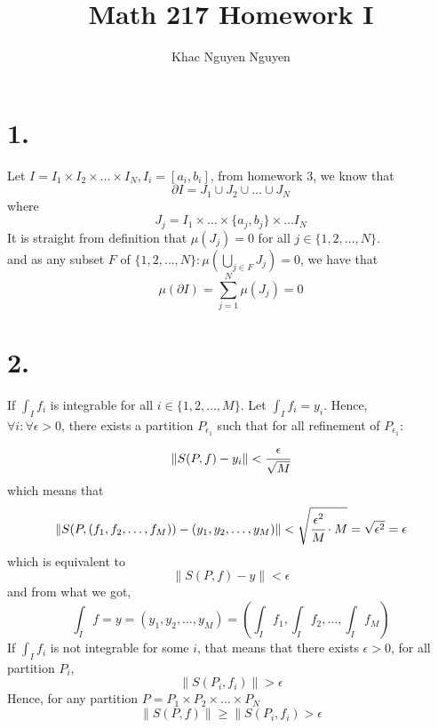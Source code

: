 \documentclass[11pt]{article}
\title{\textbf{Math 217 Homework I}}
\author{Khac Nguyen Nguyen}
\date{}
\begin{document}
\section*{1.}
Let $I = I_1 \times I_2 \times \ldots \times I_N, I_i = [a_i,b_i]$, from homework 3, we know that 
\[
    \partial I = J_1 \cup J_2 \cup \ldots \cup J_N  
\]
where 
\[
    J_j = I_1 \times \ldots \times \{a_j,b_j\} \times \ldots I_N
\]
It is straight from definition that $\mu(J_j) = 0$ for all $j \in \{1,2,\ldots ,N\}.$ \\
and as any subset $F$ of $\{1,2,\ldots,N\}: \mu(\bigcup_{j\in F} J_j) = 0$, we have that 
\[
    \mu(\partial I) = \sum_{j=1}^N \mu(J_j) = 0
\]
\pagebreak
\section*{2.}
If $\int_I f_i$ is integrable for all $i \in \{1,2,\ldots ,M\}$. Let $\int_I f_i = y_i$. Hence, \\
$\forall i: \forall \epsilon >0$, there exists a partition $P_{\epsilon_1}$ such that for all refinement of $P_{\epsilon_1}$: 
\[
    \|S(P,f) - y_i\| < \cfrac{\epsilon}{\sqrt{M}}
\]
which means that 
\[
    \|S(P,(f_1,f_2,\ldots,f_M)) - (y_1,y_2,\ldots,y_M)\| < \sqrt{\cfrac{\epsilon^2}{M} \cdot M} = \sqrt{\epsilon^2} = \epsilon
\]
which is equivalent to
\[
    \|S(P,f) - y\| < \epsilon    
\]
and from what we got, 
\[
\int_I f = y = (y_1,y_2, \ldots, y_M) = \left(\int_I f_1, \int_I f_2, \ldots, \int_I f_M\right)    
\]
If $\int_I f_i$ is not integrable for some $i$, that means that there exists $\epsilon >0$, for all partition $P_i$, 
\[
    \|S(P_i, f_i) \| > \epsilon    
\]
Hence, for any partition $P = P_1 \times P_2 \times \ldots \times P_N$
\[
    \|S(P, f) \| \ge \|S(P_i, f_i) > \epsilon
\]
\pagebreak
\end{document}

